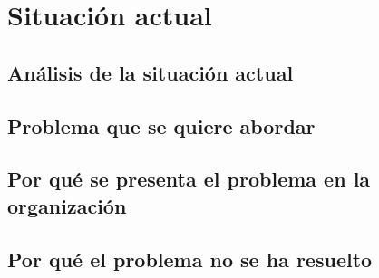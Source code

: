 \section{Situación actual}
\label{section:situacion}

\Blindtext

\subsection{Análisis de la situación actual}
\label{subsection:analisis-situacion}

\Blindtext

\subsection{Problema que se quiere abordar}
\label{subsection:problema-situacion}

\Blindtext

\subsection{Por qué se presenta el problema en la organización}
\label{subsection:justificacion-situacion1}

\Blindtext

\subsection{Por qué el problema no se ha resuelto}
\label{subsection:justificacion-situacion2}

\Blindtext

